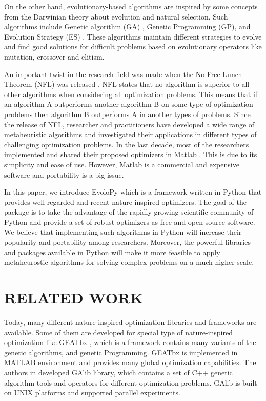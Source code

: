 \documentclass[a4paper,twoside]{article}
\begin{document}
On the other hand, evolutionary-based algorithms are inspired by some concepts from the Darwinian theory about evolution and natural selection. Such algorithms include Genetic algorithm (GA) \cite{Holland92}, Genetic Programming (GP)\cite{Koza1992}, and Evolution Strategy (ES) \cite{Beyer2002}. These algorithms maintain different strategies to evolve and find good solutions for difficult problems based on evolutionary operators like mutation, crossover and elitism. 

An important twist in the research field was made when the No Free Lunch Theorem (NFL) was released \cite{wolpert1997no,ho2002simple}. NFL states that no algorithm is superior to all other algorithms when considering all optimization problems. This means that if an algorithm A outperforms another algorithm B on some type of optimization problems then algorithm B outperforms A in another types of problems. Since the release of NFL, researcher and practitioners have developed a wide range of metaheuristic algorithms and investigated their applications in different types of challenging optimization problems. In the last decade, most of the researchers implemented and shared their proposed optimizers in Matlab \cite{Yang2010FFA,Yang2010,Mirjalili201446,Mirjalili2015228}. This is due to its simplicity and ease of use. However, Matlab is a commercial and expensive software and portability is a big issue.

In this paper, we introduce EvoloPy which is a framework written in Python that provides well-regarded and recent nature inspired optimizers. The goal of the package is to take the advantage of the rapidly growing scientific community of Python and provide a set of robust optimizers as free and open source software. We believe that implementing such algorithms in Python will increase their popularity and portability among researchers. Moreover, the powerful libraries and packages available in Python will make it more feasible to apply metaheurostic algorithms for solving complex problems on a much higher scale.



\section{\uppercase{Related Work}}
Today, many different nature-inspired optimization libraries and frameworks are available. Some of them are developed for special type of nature-inspired optimization like GEATbx \cite{GEATbx}, which is a framework contains many variants of the genetic algorithms, and genetic Programming. GEATbx is implemented in MATLAB environment and provides many global optimization capabilities. The authors in \cite {GAlib} developed GAlib library, which contains a set of C++ genetic algorithm tools and operators for different optimization problems. GAlib is built on UNIX platforms and supported parallel experiments. 
\end{document}
